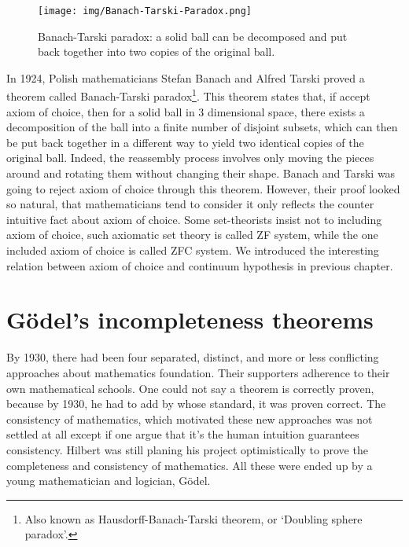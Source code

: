 \documentclass[b5paper]{article}
\begin{document}
\begin{figure}[htbp]
 \centering
 \texttt{[image: img/Banach-Tarski-Paradox.png]}
 \caption{Banach-Tarski paradox: a solid ball can be decomposed and put back together into two copies of the original ball.}
 \label{fig:Banach-Tarski-Paradox}
\end{figure}

 
In 1924, Polish mathematicians Stefan Banach and Alfred Tarski proved a theorem called Banach-Tarski paradox\footnote{Also known as Hausdorff-Banach-Tarski theorem, or `Doubling sphere paradox'.}. This theorem states that, if accept axiom of choice, then for a solid ball in 3 dimensional space, there exists a decomposition of the ball into a finite number of disjoint subsets, which can then be put back together in a different way to yield two identical copies of the original ball. Indeed, the reassembly process involves only moving the pieces around and rotating them without changing their shape. Banach and Tarski was going to reject axiom of choice through this theorem. However, their proof looked so natural, that mathematicians tend to consider it only reflects the counter intuitive fact about axiom of choice. Some set-theorists insist not to including axiom of choice, such axiomatic set theory is called ZF system, while the one included axiom of choice is called ZFC system. We introduced the interesting relation between axiom of choice and continuum hypothesis in previous chapter.

\section{Gödel's incompleteness theorems}

By 1930, there had been four separated, distinct, and more or less conflicting approaches about mathematics foundation. Their supporters adherence to their own mathematical schools. One could not say a theorem is correctly proven, because by 1930, he had to add by whose standard, it was proven correct. The consistency of mathematics, which motivated these new approaches was not settled at all except if one argue that it's the human intuition guarantees consistency\cite{M-Kline-2007}. Hilbert was still planing his project optimistically to prove the completeness and consistency of mathematics. All these were ended up by a young mathematician and logician, Gödel.
\end{document}
